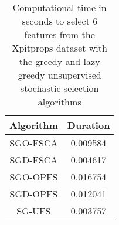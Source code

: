 \begin{table}
	\begin{center}
		\begin{tabular}{c c}
			Algorithm & Duration \\
			\hline
			SGO-FSCA & 0.009584 \\
			SGD-FSCA & 0.004617 \\
			SGO-OPFS & 0.016754 \\
			SGD-OPFS & 0.012041 \\
			SG-UFS & 0.003757 \\
		\end{tabular}
	\end{center}
	\caption{Computational time in seconds to select 6 features from the Xpitprops dataset with the greedy and lazy greedy unsupervised stochastic selection algorithms}
\end{table}